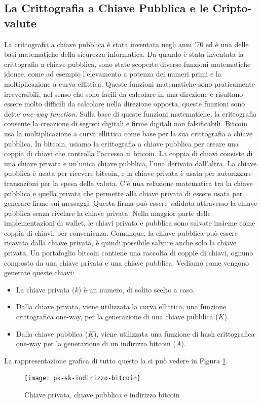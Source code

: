 \subsection{La Crittografia a Chiave Pubblica e le Cripto-valute}
La crittografia a chiave pubblica è stata inventata negli anni '70 ed è una delle basi matematiche della sicurezza informatica. Da quando è stata inventata la crittografia a chiave pubblica, sono state scoperte diverse funzioni matematiche idonee, come ad esempio l'elevamento a potenza dei numeri primi e la moltiplicazione a curva ellittica. Queste funzioni matematiche sono praticamente irreversibili, nel senso che sono facili da calcolare in una direzione e risultano essere molto difficili da calcolare nella direzione opposta, queste funzioni sono dette \textit{one-way function}. Sulla base di queste funzioni matematiche, la crittografia consente la creazione di segreti digitali e firme digitali non falsificabili. Bitcoin usa la moltiplicazione a curva ellittica come base per la sua crittografia a chiave pubblica.
In bitcoin, usiamo la crittografia a chiave pubblica per creare una coppia di chiavi che controlla l'accesso ai bitcoin. La coppia di chiavi consiste di una chiave privata e un'unica chiave pubblica, l'una derivata dall'altra. La chiave pubblica è usata per ricevere bitcoin, e la chiave privata è usata per autorizzare transazioni per la spesa della valuta. C'è una relazione matematica tra la chiave pubblica e quella privata che permette alla chiave privata di essere usata per generare firme sui messaggi. Questa firma può essere validata attraverso la chiave pubblica senza rivelare la chiave privata.
Nella maggior parte delle implementazioni di wallet, le chiavi privata e pubblica sono salvate insieme come coppia di chiavi, per convenienza. Comunque, la chiave pubblica può essere ricavata dalla chiave privata, è quindi possibile salvare anche solo la chiave privata.
Un portafoglio bitcoin contiene una raccolta di coppie di chiavi, ognuno composto da una chiave privata e una chiave pubblica. Vediamo come vengono generate queste chiavi:
\begin{itemize}
	\item La chiave privata ($k$) è un numero, di solito scelto a caso.
	\item Dalla chiave privata, viene utilizzata la curva ellittica, una funzione crittografica one-way, per la generazione di una chiave pubblica ($K$).
	\item Dalla chiave pubblica ($K$), viene utilizzata una funzione di hash crittografica one-way per la generazione di un indirizzo bitcoin ($A$).
\end{itemize}
La rappresentazione grafica di tutto questo la si può vedere in Figura \ref{fig:pk-sk-indirizzo-bitcoin}.
\begin{figure}
	\centering 
	\texttt{[image: pk-sk-indirizzo-bitcoin]} 
	\caption[Chiave privata, chiave pubblica e indirizzo bitcoin]{Chiave privata, chiave pubblica e indirizzo bitcoin}
	\label{fig:pk-sk-indirizzo-bitcoin} 
\end{figure}

